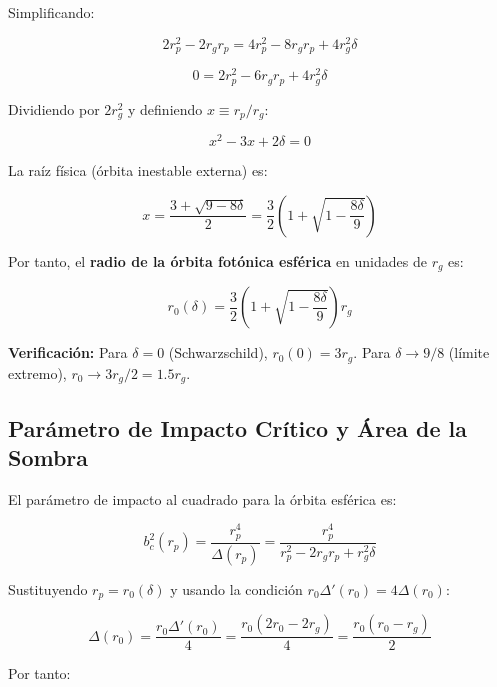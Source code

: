 \documentclass[12pt,a4paper]{article}
\begin{document}
Simplificando:

\begin{equation}
2r_p^2 - 2r_g r_p = 4r_p^2 - 8r_g r_p + 4r_g^2 \delta
\end{equation}

\begin{equation}
0 = 2r_p^2 - 6r_g r_p + 4r_g^2 \delta
\end{equation}

Dividiendo por $2r_g^2$ y definiendo $x \equiv r_p/r_g$:

\begin{equation}
x^2 - 3x + 2\delta = 0
\end{equation}

La raíz física (órbita inestable externa) es:

\begin{equation}
x = \frac{3 + \sqrt{9 - 8\delta}}{2} = \frac{3}{2}\left(1 + \sqrt{1 - \frac{8\delta}{9}}\right)
\end{equation}

Por tanto, el \textbf{radio de la órbita fotónica esférica} en unidades de $r_g$ es:

\begin{equation}
\boxed{r_0(\delta) = \frac{3}{2}\left(1 + \sqrt{1 - \frac{8\delta}{9}}\right) r_g}
\end{equation}

\textbf{Verificación:} Para $\delta=0$ (Schwarzschild), $r_0(0) = 3r_g$. Para $\delta \to 9/8$ (límite extremo), $r_0 \to 3r_g/2 = 1.5 r_g$.

\subsection{Parámetro de Impacto Crítico y Área de la Sombra}

El parámetro de impacto al cuadrado para la órbita esférica es:

\begin{equation}
b_c^2(r_p) = \frac{r_p^4}{\Delta(r_p)} = \frac{r_p^4}{r_p^2 - 2r_g r_p + r_g^2 \delta}
\end{equation}

Sustituyendo $r_p = r_0(\delta)$ y usando la condición $r_0 \Delta'(r_0) = 4\Delta(r_0)$:

\begin{equation}
\Delta(r_0) = \frac{r_0 \Delta'(r_0)}{4} = \frac{r_0(2r_0 - 2r_g)}{4} = \frac{r_0(r_0 - r_g)}{2}
\end{equation}

Por tanto:
\end{document}
